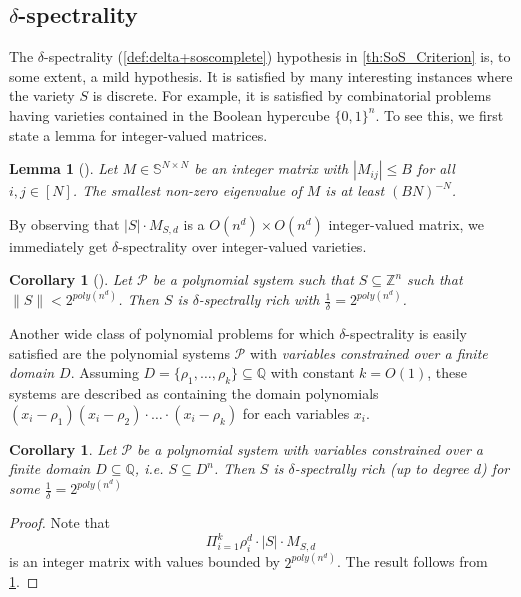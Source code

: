 \documentclass[11pt]{article}
\newcommand{\1}{\textbf{1}}
\newtheorem{lemma}[theorem]{Lemma}
\newtheorem{corollary}[theorem]{Corollary}
\begin{document}
\subsection[Delta-spectrality]{$\delta$-spectrality}\label{sect:delta_spectrality}


The $\delta$-spectrality (\cref{def:delta+soscomplete}) hypothesis in \cref{th:SoS_Criterion} is, to some extent, a mild hypothesis. It is satisfied by many interesting instances where the variety $S$ is discrete. For example, it is satisfied by combinatorial problems having varieties contained in the Boolean hypercube $\{0,1\}^n$. To see this, we first state a lemma for integer-valued matrices.

\begin{lemma}[\cite{raghavendra_weitz2017}]\label{th:spectrality_integer_matrix}
    Let $M \in \mathbb{S}^{N \times N}$ be an integer matrix with $|M_{ij}| \leq B$ for all $i,j \in [N]$. The smallest non-zero eigenvalue of $M$ is at least $(BN)^{-N}$. 
\end{lemma}

By observing that $|S| \cdot M_{S,d}$ is a $O(n^d) \times O(n^d)$ integer-valued matrix, we immediately get $\delta$-spectrality over integer-valued varieties.

\begin{corollary}[\cite{raghavendra_weitz2017}]
    Let $\mathcal{P}$ be a polynomial system such that $S \subseteq \mathbb{Z}^n$ such that $\| S \| < 2^{poly(n^d)}$. Then $S$ is $\delta$-spectrally rich with $\frac{1}{\delta} = 2^{poly(n^d)}$.
\end{corollary}

Another wide class of polynomial problems for which $\delta$-spectrality is easily satisfied are the polynomial systems $\mathcal{P}$ with \textit{variables constrained over a finite domain $D$}. Assuming $D =\{\rho_1, \dots, \rho_k\} \subseteq \mathbb{Q}$ with constant $k=O(1)$, these systems are described as containing the domain polynomials $(x_i - \rho_1)(x_i - \rho_2) \cdot \dots \cdot (x_i - \rho_k)$ for each variables $x_i$.

\begin{corollary}\label{cor:rich-finite}
    Let $\mathcal{P}$ be a polynomial system with variables constrained over a finite domain $D \subseteq \mathbb{Q}$, i.e. $S \subseteq D^n$. Then $S$ is $\delta$-spectrally rich (up to degree $d$) for some $\frac{1}{\delta} = 2^{poly(n^d)}$ 
\end{corollary}

\begin{proof}
    Note that
    \begin{equation*}
       \Pi_{i=1}^k \rho_i^d \cdot |S| \cdot M_{S,d}
    \end{equation*}
    is an integer matrix with values bounded by $2^{poly(n^d)}$. The result follows from \cref{th:spectrality_integer_matrix}.
\end{proof}
\end{document}

